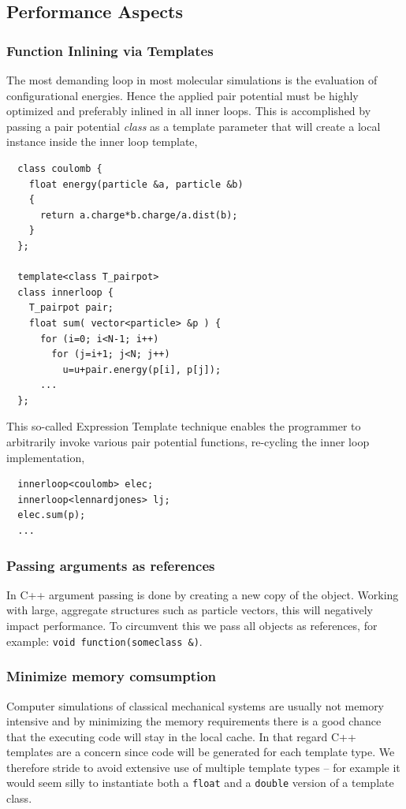 \documentclass[10pt]{bmc_article}
\newenvironment{bmcformat}{\fussy\setboolean{publ}{true}}{\fussy}
\begin{document}
\begin{bmcformat}
\subsection*{Performance Aspects}
\subsubsection*{Function Inlining via Templates}
The most demanding loop in most molecular simulations is the evaluation of configurational energies.
Hence the applied pair potential must be highly optimized and preferably inlined in all inner loops.
This is accomplished by passing a pair potential \emph{class} as a template parameter that will create a local instance inside the inner loop template,
\begin{verbatim}
  class coulomb {
    float energy(particle &a, particle &b)
    {
      return a.charge*b.charge/a.dist(b);
    }
  };

  template<class T_pairpot>
  class innerloop {
    T_pairpot pair;
    float sum( vector<particle> &p ) {
      for (i=0; i<N-1; i++)
        for (j=i+1; j<N; j++) 
          u=u+pair.energy(p[i], p[j]);
      ...
  };
\end{verbatim}
This so-called Expression Template technique enables the programmer to arbitrarily invoke various pair potential functions, re-cycling the inner loop implementation,
\begin{verbatim}
  innerloop<coulomb> elec;
  innerloop<lennardjones> lj;
  elec.sum(p);
  ...
\end{verbatim}

\subsubsection*{Passing arguments as references}
In C++ argument passing is done by creating a new copy of the object. Working with large, aggregate structures such as particle vectors, this will negatively impact performance. To circumvent this we pass all objects as references, for example: \verb"void function(someclass &)".

\subsubsection*{Minimize memory comsumption}
Computer simulations of classical mechanical systems are usually not memory intensive and by minimizing the memory requirements there is a good chance that the executing code will stay in the local cache. In that regard C++ templates are a concern since code will be generated for each template type. We therefore stride to avoid extensive use of multiple template types -- for example it would seem silly to instantiate both a \verb"float" and a \verb"double" version of a template class.


\end{bmcformat}
\end{document}
